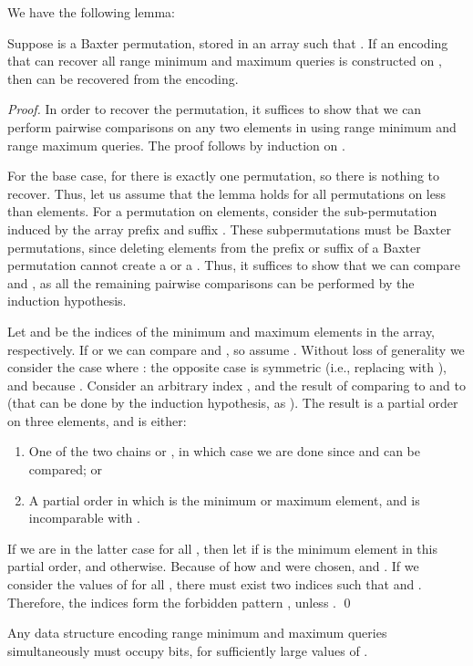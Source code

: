 \documentclass[runningheads]{llncs}
\begin{document}
We have the following lemma:

\begin{lemma}\label{lem:baxter}
Suppose  is a Baxter permutation, stored in an array 
such that .  If an encoding that can recover all range
minimum and maximum queries is constructed on , then  can be
recovered from the encoding.
\end{lemma}

\begin{proof}
In order to recover the permutation, it suffices to show that we can
perform pairwise comparisons on any two elements in  using range
minimum and range maximum queries. The proof follows by induction on
.

For the base case, for  there is exactly one permutation, so there
is nothing to recover. Thus, let us assume that the lemma holds for all
permutations on less than  elements.  For a permutation on 
elements, consider the sub-permutation induced by the array prefix
 and suffix .  These subpermutations must be
Baxter permutations, since deleting elements from the prefix or suffix
of a Baxter permutation cannot create a  or a .  Thus,
it suffices to show that we can compare  and , as all
the remaining pairwise comparisons can be performed by the induction
hypothesis.

Let  and  be the indices of
the minimum and maximum elements in the array, respectively. If
 or  we can compare  and , so
assume .  Without loss of generality we consider the
case where : the opposite case is symmetric (i.e., replacing
 with ), and  because . Consider an arbitrary index , and the result of
comparing  to  and  to  (that can be done by
the induction hypothesis, as ).  The result is a partial
order on three elements, and is either:
\begin{enumerate}
  \item One of the two chains  or , in which case we are done since  and  can be
    compared; or
 \item A partial order in which  is the minimum or maximum
   element, and  is incomparable with .
\end{enumerate}
If we are in the latter case for all , then let  if  is the minimum element in this partial order, and  otherwise. Because of how  and  were chosen,  and
. If we consider the values of  for all ,
there must exist two indices  such that  and
.  Therefore, the indices  form the forbidden
pattern , unless .  \qed
\end{proof}

\begin{theorem}\label{thm:min-max-lb}
Any data structure encoding range minimum and maximum queries
simultaneously must occupy  bits, for
sufficiently large values of .
\end{theorem}
\end{document}
